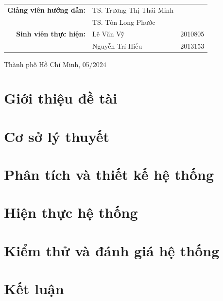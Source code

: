 \documentclass[a4paper]{report}
\begin{document}
\begin{titlepage}
	\begin{table}[H]
		\centering
		\begin{tabular}{rll}
			\textbf{Giảng viên hướng dẫn:} & TS. Trương Thị Thái Minh &         \\
			                               & TS. Tôn Long Phước       &         \\
			\textbf{Sinh viên thực hiện:}  & Lê Văn Vỹ                & 2010805 \\
			                               & Nguyễn Trí Hiếu          & 2013153 \\
		\end{tabular}
	\end{table}

	\vspace{3cm}
	\begin{center}
		{\footnotesize Thành phố Hồ Chí Minh, 05/2024}
	\end{center}
\end{titlepage}
\vspace{20cm}

\pagebreak

\pagebreak
\tableofcontents
\pagebreak
{}
\pagebreak
\makeatletter
\makeatother
\listoffigures
\pagebreak
\listoftables
\pagebreak
\printnoidxglossary[type=\acronymtype,title=Danh sách từ ngữ viết tắt]
\pagebreak


\chapter{Giới thiệu đề tài}
% 
\chapter{Cơ sở lý thuyết}

\newpage
\chapter{Phân tích và thiết kế hệ thống}

\newpage
\chapter{Hiện thực hệ thống}

\newpage
\chapter{Kiểm thử và đánh giá hệ thống}

\newpage
\chapter{Kết luận}

\newpage

\end{document}
